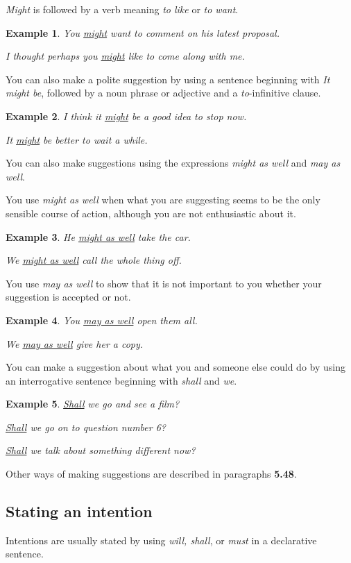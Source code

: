 \documentclass[oneside]{book}
\numberwithin{equation}{section}
\newtheorem{example}{Example}[section]
\begin{document}
\textit{Might} is followed by a verb meaning \textit{to like} or \textit{to want}.
\begin{example}
    You \underline{might} want to comment on his latest proposal.
    
    I thought perhaps you \underline{might} like to come along with me.
\end{example}
You can also make a polite suggestion by using a sentence beginning with \textit{It might be}, followed by a noun phrase or adjective and a \textit{to}-infinitive clause.
\begin{example}
    I think it \underline{might} be a good idea to stop now.
    
    It \underline{might} be better to wait a while.
\end{example}
%
\noindent{} You can also make suggestions using the expressions \textit{might as well} and \textit{may as well}.

%
You use \textit{might as well} when what you are suggesting seems to be the only sensible course of action, although you are not enthusiastic about it.
\begin{example}
    He \underline{might as well} take the car.
    
    We \underline{might as well} call the whole thing off.
\end{example}
You use \textit{may as well} to show that it is not important to you whether your suggestion is accepted or not.
\begin{example}
    You \underline{may as well} open them all.
    
    We \underline{may as well} give her a copy.
\end{example}
%
\noindent{} You can make a suggestion about what you and someone else could do by using an interrogative sentence beginning with \textit{shall} and \textit{we}.
\begin{example}
    \underline{Shall} we go and see a film?
    
    \underline{Shall} we go on to question number 6?
    
    \underline{Shall} we talk about something different now?
\end{example}
%
\noindent{} Other ways of making suggestions are described in paragraphs \textbf{5.48}.

\subsection{Stating an intention}
\noindent{} Intentions are usually stated by using \textit{will, shall}, or \textit{must} in a declarative sentence.
\end{document}
